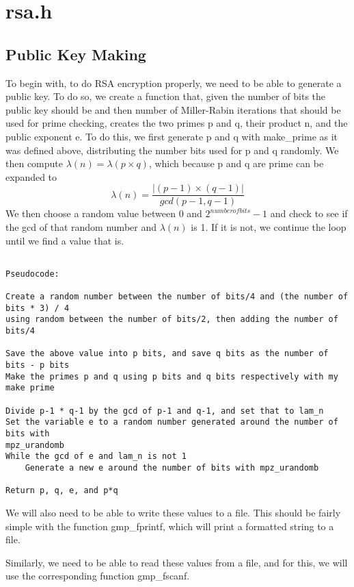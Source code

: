 \documentclass[11pt]{article}
\begin{document}
\section{rsa.h}

\subsection{Public Key Making}

To begin with, to do RSA encryption properly, we need to be able to generate a public key. To do so, we create a function that, given the number of bits the public key should be and then number of Miller-Rabin iterations that should be used for prime checking, creates the two primes p and q, their product n, and the public exponent e. To do this, we first generate p and q with make\_prime as it was defined above, distributing the number bits used for p and q randomly. We then compute $\lambda(n) = \lambda(p\times q)$, which because p and q are prime can be expanded to
\[ \lambda(n) = \frac {|(p-1)\times (q-1)|} {gcd(p-1, q-1)} \]
We then choose a random value between 0 and $2^{number of bits}-1$ and check to see if the gcd of that random number and $\lambda(n)$ is 1. If it is not, we continue the loop until we find a value that is.

\begin{verbatim}

Pseudocode:

Create a random number between the number of bits/4 and (the number of bits * 3) / 4
using random between the number of bits/2, then adding the number of bits/4

Save the above value into p bits, and save q bits as the number of bits - p bits
Make the primes p and q using p bits and q bits respectively with my make prime

Divide p-1 * q-1 by the gcd of p-1 and q-1, and set that to lam_n
Set the variable e to a random number generated around the number of bits with
mpz_urandomb
While the gcd of e and lam_n is not 1
    Generate a new e around the number of bits with mpz_urandomb

Return p, q, e, and p*q

\end{verbatim}

We will also need to be able to write these values to a file. This should be fairly simple with the function gmp\_fprintf, which will print a formatted string to a file.

Similarly, we need to be able to read these values from a file, and for this, we will use the corresponding function gmp\_fscanf.
\end{document}
